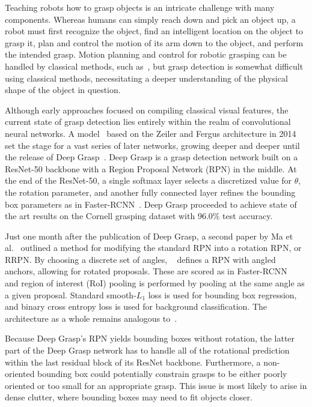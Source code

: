 \documentclass[10pt,twocolumn,letterpaper]{article}
\begin{document}
Teaching robots how to grasp objects is an intricate challenge with many components. Whereas humans can simply reach down and pick an object up, a robot must first recognize the object, find an intelligent location on the object to grasp it, plan and control the motion of its arm down to the object, and perform the intended grasp. Motion planning and control for robotic grasping can be handled by classical methods, such as~\cite{chitta12}, but grasp detection is somewhat difficult using classical methods, necessitating a deeper understanding of the physical shape of the object in question.

Although early approaches focused on compiling classical visual features, the current state of grasp detection lies entirely within the realm of convolutional neural networks. A model~\cite{redmon14} based on the Zeiler and Fergus architecture in 2014 set the stage for a vast series of later networks, growing deeper and deeper until the release of Deep Grasp~\cite{vela2018}. Deep Grasp is a grasp detection network built on a ResNet-50 backbone with a Region Proposal Network (RPN) in the middle. At the end of the ResNet-50, a single softmax layer selects a discretized value for $\theta$, the rotation parameter, and another fully connected layer refines the bounding box parameters as in Faster-RCNN~\cite{ren15}. Deep Grasp proceeded to achieve state of the art results on the Cornell grasping dataset with 96.0\% test accuracy.

Just one month after the publication of Deep Grasp, a second paper by Ma et al.~\cite{ma18} outlined a method for modifying the standard RPN into a rotation RPN, or RRPN. By choosing a discrete set of angles, ~\cite{ma18} defines a RPN with angled anchors, allowing for rotated proposals. These are scored as in Faster-RCNN~\cite{ren15} and region of interest (RoI) pooling is performed by pooling at the same angle as a given proposal. Standard smooth-$L_1$ loss is used for bounding box regression, and binary cross entropy loss is used for background classification. The architecture as a whole remains analogous to~\cite{ren15}. 

Because Deep Grasp's RPN yields bounding boxes without rotation, the latter part of the Deep Grasp network has to handle all of the rotational prediction within the last residual block of its ResNet backbone. Furthermore, a non-oriented bounding box could potentially constrain grasps to be either poorly oriented or too small for an appropriate grasp. This issue is most likely to arise in dense clutter, where bounding boxes may need to fit objects closer.
\end{document}
